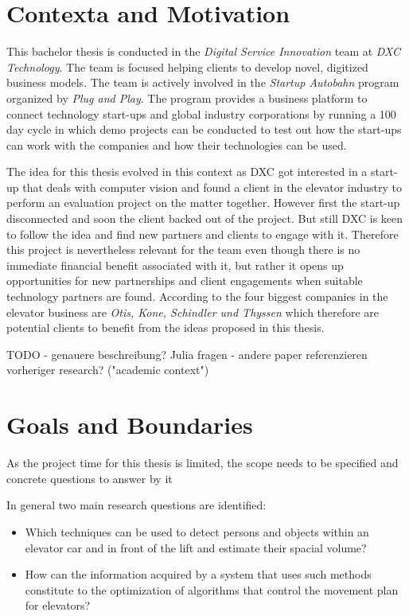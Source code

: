 \section{Contexta and Motivation}

This bachelor thesis is conducted in the \emph{Digital Service Innovation} team at \emph{DXC Technology}.
The team is focused helping clients to develop novel, digitized business models.
The team is actively involved in the \emph{Startup Autobahn} program organized by \emph{Plug and Play}.
The program provides a business platform to connect technology start-ups and global industry corporations
by running a 100 day cycle in which demo projects can be conducted to test out how the start-ups can work with the companies and how their technologies can be used.

The idea for this thesis evolved in this context as DXC got interested in a start-up that deals with computer vision and found a client in the elevator industry to perform an evaluation project on the matter together.
However first the start-up disconnected and soon the client backed out of the project.
But still DXC is keen to follow the idea and find new partners and clients to engage with it.
Therefore this project is nevertheless relevant for the team even though there is no immediate financial benefit associated with it, 
but rather it opens up opportunities for new partnerships and client engagements when suitable technology partners are found.
According to \textcite[][p.~4]{unger2015aufzuege} the four biggest companies in the elevator business are \emph{Otis, Kone, Schindler und Thyssen} which therefore are potential clients to benefit from the ideas proposed in this thesis.



TODO
- genauere beschreibung? Julia fragen
- andere paper referenzieren vorheriger research? ("academic context")


\section{Goals and Boundaries}

As the project time for this thesis is limited, the scope needs to be specified and concrete questions to answer by it  

In general two main research questions are identified:

\begin{itemize}
    \item Which techniques can be used to detect persons and objects within an elevator car and in front of the lift and estimate their spacial volume?
    \item How can the information acquired by a system that uses such methods constitute to the optimization of algorithms that control the movement plan for elevators?
\end{itemize}

